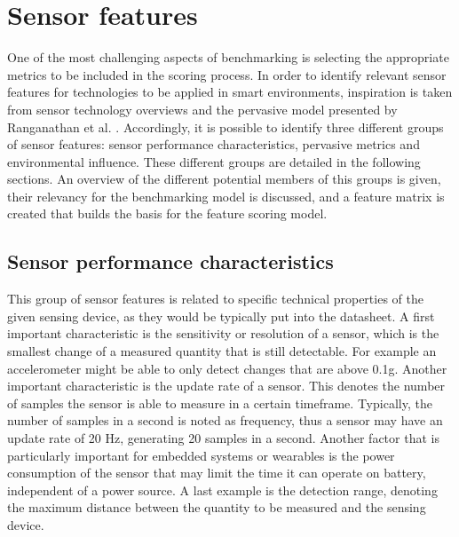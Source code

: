 \section{Sensor features}
One of the most challenging aspects of benchmarking is selecting the appropriate metrics to be included in the scoring process. In order to identify relevant sensor features for technologies to be applied in smart environments, inspiration is taken from sensor technology overviews \cite{wilson2004sensor} and the pervasive model presented by Ranganathan et al. \cite{ranganathan2005towards}.  Accordingly, it is possible to identify three different groups of sensor features: sensor performance characteristics, pervasive metrics and environmental influence. These different groups are detailed in the following sections. An overview of the different potential members of this groups is given, their relevancy for the benchmarking model is discussed, and a feature matrix is created that builds the basis for the feature scoring model.

\subsection{Sensor performance characteristics}
This group of sensor features is related to specific technical properties of the given sensing device, as they would be typically put into the datasheet. A first important characteristic is the sensitivity or resolution of a sensor, which is the smallest change of a measured quantity that is still detectable. For example an accelerometer might be able to only detect changes that are above 0.1g. Another important characteristic is the update rate of a sensor. This denotes the number of samples the sensor is able to measure in a certain timeframe. Typically, the number of samples in a second is noted as frequency, thus a sensor may have an update rate of 20 Hz, generating 20 samples in a second. Another factor that is particularly important for embedded systems or wearables is the power consumption of the sensor that may limit the time it can operate on battery, independent of a power source. A last example is the detection range, denoting the maximum distance between the quantity to be measured and the sensing device.

